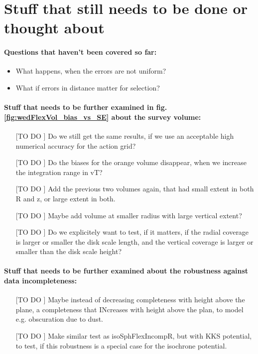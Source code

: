 \section{Stuff that still needs to be done or thought about}

\paragraph{Questions that haven't been covered so far:}
\begin{itemize}
\item What happens, when the errors are not uniform?
\item What if errors in distance matter for selection?
\end{itemize}

\paragraph{Stuff that needs to be further examined in fig. \ref{fig:wedFlexVol_bias_vs_SE} about the survey volume:}
\begin{itemize}
\item[[TO DO]] Do we still get the same results, if we use an acceptable high numerical accuracy for the action grid?
\item[[TO DO]] Do the biases for the orange volume disappear, when we increase the integration range in vT?
\item[[TO DO]] Add the previous two volumes again, that had small extent in both R and z, or large extent in both.
\item[[TO DO]] Maybe add volume at smaller radius with large vertical extent?
\item[[TO DO]] Do we explicitely want to test, if it matters, if the radial coverage is larger or smaller the disk scale length, and the vertical coverage is larger or smaller than the disk scale height?
\end{itemize}

\paragraph{Stuff that needs to be further examined about the robustness against data incompleteness:}
\begin{itemize}
\item[[TO DO]] Maybe instead of decreasing completeness with height above the plane, a completeness
that INcreases with height above the plan, to model e.g. obscuration due to dust.
\item[[TO DO]] Make similar test as isoSphFlexIncompR, but with KKS potential, to test, if this
robustness is a special case for the isochrone potential.
\end{itemize}

